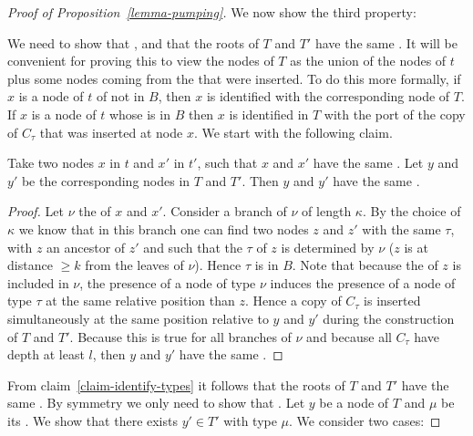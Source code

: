 \begin{proof}[Proof of Proposition~\ref{lemma-pumping}]
We now show the third property:

  \begin{lem}\label{claim-sameblock}
  \end{lem}

\proof
  We need to show that ,  and that
  the roots of $T$ and $T'$ have the same . It will be convenient for
  proving this to view the nodes of $T$ as the union of the nodes of $t$ plus
  some nodes coming from the \kloops that were inserted. To do this more
  formally, if $x$ is a node of $t$ of \ktype not in $B$, then $x$ is
  identified with the corresponding node of $T$. If $x$ is a node of $t$ whose
  \ktype is in $B$ then $x$ is identified in $T$ with the port of the copy of
  $C_\tau$ that was inserted at node $x$.  We start with the following claim.


  \begin{claim} \label{claim-identify-types} Take two nodes $x$ in $t$ and $x'$
    in $t'$, such that $x$ and $x'$ have the same \type{\kappa}. Let $y$ and $y'$ be
    the corresponding nodes in $T$ and $T'$. Then $y$ and $y'$ have the same
    .
\end{claim}


\begin{proof}
  Let $\nu$ the \type{\kappa} of $x$ and $x'$.  Consider a branch of $\nu$ of
  length $\kappa$. By the choice of $\kappa$ we know that in this branch one
  can find two nodes $z$ and $z'$ with the same \ktypes $\tau$, with $z$ an
  ancestor of $z'$ and such that the \ktype $\tau$ of $z$ is determined by
  $\nu$ ($z$ is at distance $\geq k$ from the leaves of $\nu$). Hence $\tau$ is
  in $B$.  Note that because the \ktype of $z$ is included in $\nu$, the
  presence of a node of type $\nu$ induces the presence of a node of type
  $\tau$ at the same relative position than $z$. Hence a copy of $C_\tau$ is
  inserted simultaneously at the same position relative to $y$ and $y'$ during the
  construction of $T$ and $T'$.  Because this is true for all branches of $\nu$
  and because all $C_\tau$ have depth at least $l$, then $y$ and $y'$ have the
  same .
\end{proof}

From claim~\ref{claim-identify-types} it follows that the roots of $T$ and $T'$
have the same . By symmetry we only need to show that
. Let $y$ be a node of $T$ and $\mu$ be its . We
show that there exists $y' \in T'$ with type $\mu$. We consider two cases:


\end{proof}
